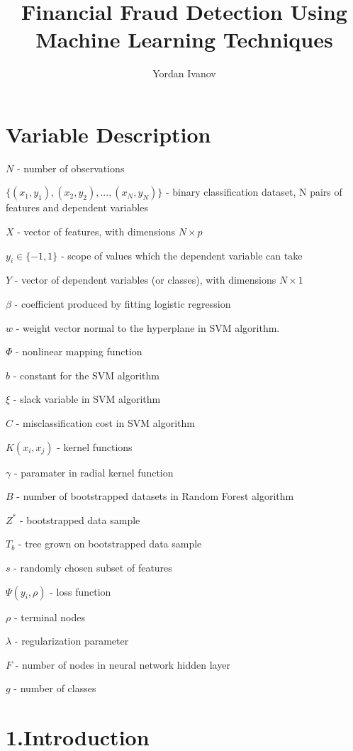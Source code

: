 \documentclass[12pt,]{article}
\title{Financial Fraud Detection Using Machine Learning Techniques}
\author{Yordan Ivanov}
\date{}
\begin{document}
\maketitle

\hypertarget{variable-description}{%
\section{Variable Description}\label{variable-description}}

\(N\) - number of observations

\({\{(x_1,y_1),(x_2,y_2),...,(x_N,y_N)\}}\) - binary classification
dataset, N pairs of features and dependent variables

\(X\) - vector of features, with dimensions \(N\times p\)

\(y_i \in \{-1,1\}\) - scope of values which the dependent variable can
take

\(Y\) - vector of dependent variables (or classes), with dimensions
\(N\times1\)

\(\beta\) - coefficient produced by fitting logistic regression

\(w\) - weight vector normal to the hyperplane in SVM algorithm.

\(\Phi\) - nonlinear mapping function

\(b\) - constant for the SVM algorithm

\(\xi\) - slack variable in SVM algorithm

\(C\) - misclassification cost in SVM algorithm

\(K(x_i,x_j)\) - kernel functions

\(\gamma\) - paramater in radial kernel function

\(B\) - number of bootstrapped datasets in Random Forest algorithm

\(Z^*\) - bootstrapped data sample

\(T_b\) - tree grown on bootstrapped data sample

\(s\) - randomly chosen subset of features

\(\Psi(y_i,\rho)\) - loss function

\(\rho\) - terminal nodes

\(\lambda\) - regularization parameter

\(F\) - number of nodes in neural network hidden layer

\(g\) - number of classes

\hypertarget{introduction}{%
\section{1.Introduction}\label{introduction}}
\end{document}
